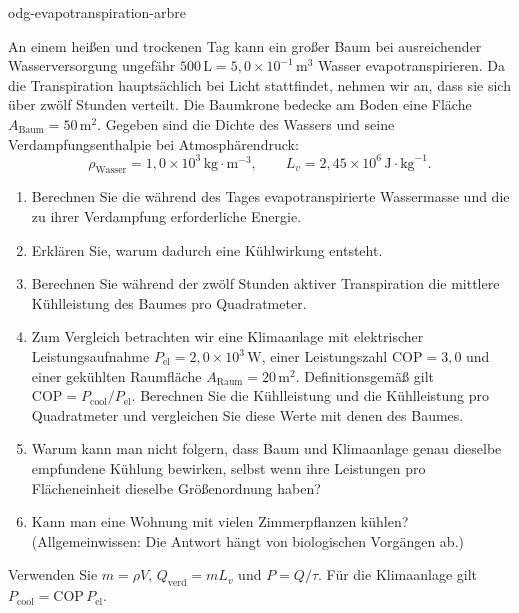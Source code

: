 \begin{exo}{odg-evapotranspiration-arbre}

An einem heißen und trockenen Tag kann ein großer Baum bei ausreichender Wasserversorgung ungefähr $500\,\text{L}=5{,}0\times10^{-1}\,\text{m}^3$ Wasser evapotranspirieren. Da die Transpiration hauptsächlich bei Licht stattfindet, nehmen wir an, dass sie sich über zwölf Stunden verteilt. Die Baumkrone bedecke am Boden eine Fläche $A_{\text{Baum}}=50\,\text{m}^2$. Gegeben sind die Dichte des Wassers und seine Verdampfungsenthalpie bei Atmosphärendruck:
\[
\rho_{\text{Wasser}}=1{,}0\times10^3\,\text{kg}\!\cdot\!\text{m}^{-3},
\qquad L_v=2{,}45\times10^6\,\text{J}\!\cdot\!\text{kg}^{-1}.
\]

\begin{enumerate}
  \item Berechnen Sie die während des Tages evapotranspirierte Wassermasse und die zu ihrer Verdampfung erforderliche Energie.
  \item Erklären Sie, warum dadurch eine Kühlwirkung entsteht.
  \item Berechnen Sie während der zwölf Stunden aktiver Transpiration die mittlere Kühlleistung des Baumes pro Quadratmeter.
  \item Zum Vergleich betrachten wir eine Klimaanlage mit elektrischer Leistungsaufnahme $P_{\mathrm{el}}=2{,}0\times10^3\,\text{W}$, einer Leistungszahl $\mathrm{COP}=3{,}0$ und einer gekühlten Raumfläche $A_{\mathrm{Raum}}=20\,\text{m}^2$. Definitionsgemäß gilt $\mathrm{COP}=P_{\mathrm{cool}}/P_{\mathrm{el}}$. Berechnen Sie die Kühlleistung und die Kühlleistung pro Quadratmeter und vergleichen Sie diese Werte mit denen des Baumes.
  \item Warum kann man nicht folgern, dass Baum und Klimaanlage genau dieselbe empfundene Kühlung bewirken, selbst wenn ihre Leistungen pro Flächeneinheit dieselbe Größenordnung haben?
  \item Kann man eine Wohnung mit vielen Zimmerpflanzen kühlen? (Allgemeinwissen: Die Antwort hängt von biologischen Vorgängen ab.)
\end{enumerate}

\begin{indication}
Verwenden Sie $m=\rho V$, $Q_{\mathrm{verd}}=mL_v$ und $P=Q/\tau$. Für die Klimaanlage gilt $P_{\mathrm{cool}}=\mathrm{COP}\,P_{\mathrm{el}}$.
\end{indication}


\end{exo}
